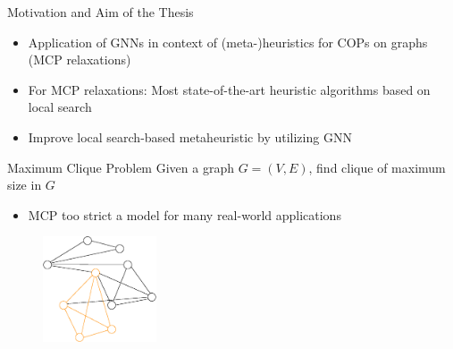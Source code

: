 \documentclass{beamer}
\begin{document}
\begin{frame}{Motivation and Aim of the Thesis}
    \begin{itemize}
        \item<1-> Application of GNNs in context of (meta-)heuristics for COPs on graphs (MCP relaxations)
        \item<2-> For MCP relaxations: Most state-of-the-art heuristic algorithms based on local search
        \item<3-> Improve local search-based metaheuristic by utilizing GNN
    \end{itemize}
\end{frame}

\begin{frame}{Maximum Clique Problem}
    Given a graph $G = (V,E)$, find clique of maximum size in $G$
    \begin{itemize}
        \item MCP too strict a model for many real-world applications
    \end{itemize}
    \begin{figure}
        \centering
        \includegraphics[width=0.3\textwidth]{graphics/graph1-clique.eps}
    \end{figure}
\end{frame} 
\end{document}
